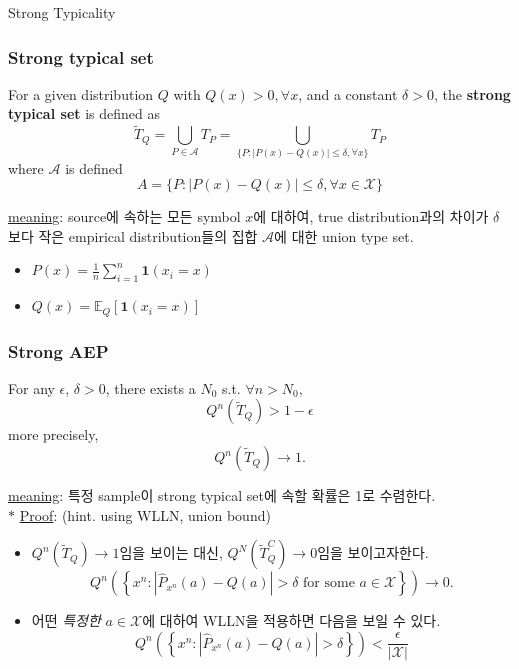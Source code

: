 \documentclass[9pt]{beamer}
\begin{document}
    \begin{section}{Strong Typicality}
        \begin{frame}
            \frametitle{Strong typical set}
            \begin{definition}
                For a given distribution $Q$ with $Q(x)>0, \forall x$, and a constant $\delta>0$, the \textbf{strong typical set} is defined as 
                $$ \tilde{T}_Q= \bigcup_{P \in \mathcal A} T_P=\bigcup_{\{P : |P(x)-Q(x)| \leq \delta, \forall x \}} T_P $$
                where $\mathcal A$ is defined 
                $$ A = \{P : |P(x) - Q(x)| \le \delta, \forall x \in \mathcal X\}$$
            \end{definition}
            \vspace{0.2cm}
            \checkmark \underline{meaning}: source에 속하는 모든 symbol $x$에 대하여, true distribution과의 차이가 $\delta$보다 작은 empirical distribution들의 집합 $\mathcal A$에 대한 union type set.
            \begin{itemize}
                \item $P(x) = \frac{1}{n} \sum^n_{i=1} \mathbf 1 (x_i = x)$
                \item $Q(x) = \mathbb E_{Q}[\mathbf 1 (x_i = x)]$
            \end{itemize}


        \end{frame}

        \begin{frame}
            \frametitle{Strong AEP}
            \begin{theorem}
                For any $\epsilon$, $\delta>0$, there exists a $N_0$ s.t. $\forall n > N_0$,
                $$
                Q^n(\tilde{T}_Q)>1-\epsilon
                $$
                more precisely,
                $$ Q^n (\tilde T_Q) \rightarrow 1. $$
            \end{theorem}
            \vspace{0.2cm}
            \checkmark \underline{meaning}: 특정 sample이 strong typical set에 속할 확률은 1로 수렴한다.
            \vspace{0.2cm}
            \\$\ast$ \underline{Proof}: (hint. using WLLN, union bound)
            \begin{itemize}
                \item $Q^n(\tilde T_Q) \rightarrow 1$임을 보이는 대신, $Q^N(\tilde T_Q^C) \rightarrow 0$임을 보이고자한다.
                $$ Q^n\left(\left\{x^n:\left|\hat{P}_{x^n}(a)-Q(a)\right|>\delta \text { for some } a \in \mathcal{X}\right\}\right) \rightarrow 0 . $$
                \item 어떤 \textit{특정한} $a \in \mathcal X$에 대하여 WLLN을 적용하면 다음을 보일 수 있다.
                $$ Q^n\left(\left\{x^n:\left|\hat{P}_{x^n}(a)-Q(a)\right|>\delta\right\}\right)<\frac{\epsilon}{|\mathcal{X}|}$$ 
            \end{itemize}
        \end{frame}


\end{section}
\end{document}

